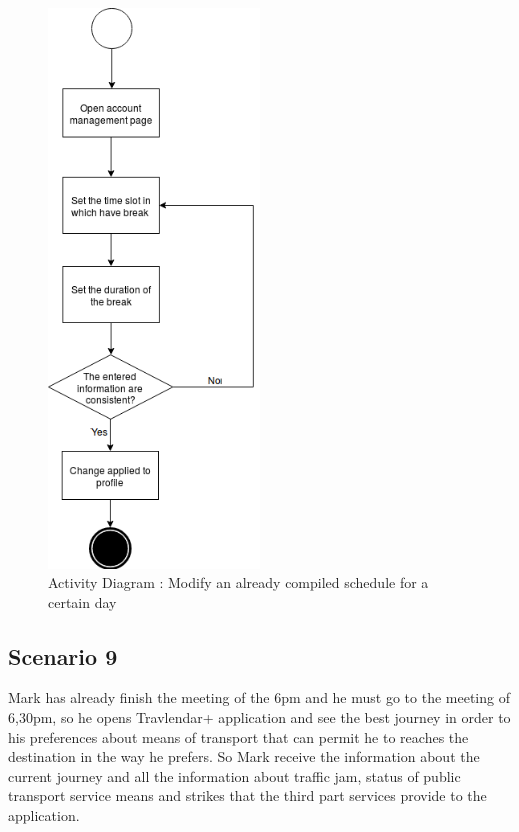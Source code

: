 \documentclass[numbers=noenddot, 12pt, a4paper, oneside]{scrbook}
\begin{document}
\begin{figure}[H]
	\centering
	\includegraphics[width=0.5\textwidth]{flows/Scenario8}
	\caption{Activity Diagram : Modify an already compiled schedule for a certain day}
\end{figure}


\newpage
\subsection*{Scenario 9}

Mark has already finish the meeting of the 6pm and he must go to the meeting of 6,30pm, so he opens Travlendar+ application and see the best journey in order to his preferences about means of transport that can permit he to reaches the destination in the way he prefers.
So Mark receive the information about the current journey and all the information about traffic jam, status of public transport service means and strikes that the third part services provide to the application.
\\
\end{document}
